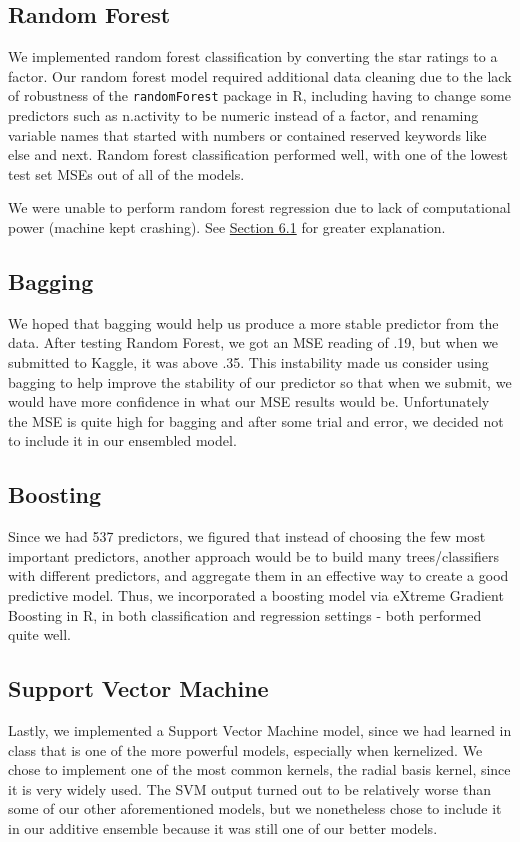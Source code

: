 \documentclass[10pt]{article}
\begin{document}
\subsection{Random Forest}
We implemented random forest classification by converting the star ratings to a factor. Our random forest model required additional data cleaning due to the lack of robustness of the \texttt{randomForest} package in R, including having to change some predictors such as n.activity to be numeric instead of a factor, and renaming variable names that started with numbers or contained reserved keywords like else and next. Random forest classification performed well, with one of the lowest test set MSEs out of all of the models. 
\vspace{0.1in}

\noindent
We were unable to perform random forest regression due to lack of computational power (machine kept crashing). See \hyperref[sixpointone]{\color{blue}Section 6.1\color{black}} for greater explanation.

\subsection{Bagging}
We hoped that bagging would help us produce a more stable predictor from the data. After testing Random Forest, we got an MSE reading of .19, but when we submitted to Kaggle, it was above .35. This instability made us consider using bagging to help improve the stability of our predictor so that when we submit, we would have more confidence in what our MSE results would be. Unfortunately the MSE is quite high for bagging and after some trial and error, we decided not to include it in our ensembled model.

\subsection{Boosting}
Since we had 537 predictors, we figured that instead of choosing the few most important predictors, another approach would be to build many trees/classifiers with different predictors, and aggregate them in an effective way to create a good predictive model. Thus, we incorporated a boosting model via eXtreme Gradient Boosting in R, in both classification and regression settings - both performed quite well.

\subsection{Support Vector Machine}
Lastly, we implemented a Support Vector Machine model, since we had learned in class that is one of the more powerful models, especially when kernelized. We chose to implement one of the most common kernels, the radial basis kernel, since it is very widely used. The SVM output turned out to be relatively worse than some of our other aforementioned models, but we nonetheless chose to include it in our additive ensemble because it was still one of our better models.
\end{document}

